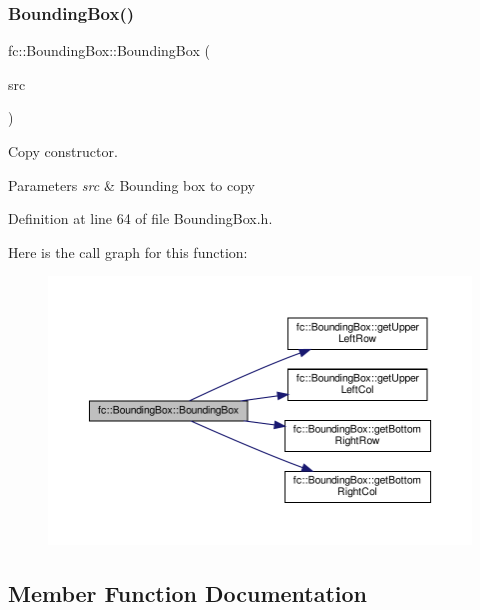 \subsubsection{\texorpdfstring{Bounding\+Box()}{BoundingBox()}\hspace{0.1cm}{\footnotesize\ttfamily [2/2]}}
{\footnotesize\ttfamily fc\+::\+Bounding\+Box\+::\+Bounding\+Box (\begin{DoxyParamCaption}\item[{const \hyperlink{classfc_1_1BoundingBox}{Bounding\+Box} \&}]{src }\end{DoxyParamCaption})\hspace{0.3cm}{\ttfamily [inline]}}



Copy constructor. 


\begin{DoxyParams}{Parameters}
{\em src} & Bounding box to copy \\
\hline
\end{DoxyParams}


Definition at line 64 of file Bounding\+Box.\+h.

Here is the call graph for this function\+:
\nopagebreak
\begin{figure}[H]
\begin{center}
\leavevmode
\includegraphics[width=350pt]{db/dc1/classfc_1_1BoundingBox_aeb427ee69514165e4d4357a007c963c1_cgraph}
\end{center}
\end{figure}


\subsection{Member Function Documentation}
\mbox{\label{classfc_1_1BoundingBox_acdd286d48651286d78c1b1eabe2357c9}} 
